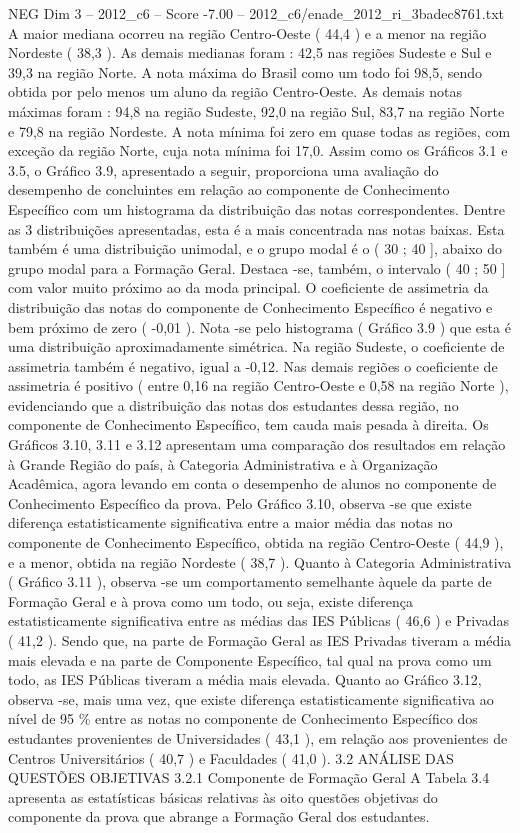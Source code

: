 \begin{textsample}{NEG Dim 3 – 2012\_c6 – Score -7.00 – 2012\_c6/enade\_2012\_ri\_3badec8761.txt}
A maior mediana ocorreu na região Centro-Oeste ( 44,4 ) e a menor na região Nordeste ( 38,3 ).
As demais medianas foram : 42,5 nas regiões Sudeste e Sul e 39,3 na região Norte.
A nota máxima do Brasil como um todo foi 98,5, sendo obtida por pelo menos um aluno da região Centro-Oeste.
As demais notas máximas foram : 94,8 na região Sudeste, 92,0 na região Sul, 83,7 na região Norte e 79,8 na região Nordeste.
A nota mínima foi zero em quase todas as regiões, com exceção da região Norte, cuja nota mínima foi 17,0.
Assim como os Gráficos 3.1 e 3.5, o Gráfico 3.9, apresentado a seguir, proporciona uma avaliação do desempenho de concluintes em relação ao componente de Conhecimento Específico com um histograma da distribuição das notas correspondentes.
Dentre as 3 distribuições apresentadas, esta é a mais concentrada nas notas baixas.
Esta também é uma distribuição unimodal, e o grupo modal é o ( 30 ; 40 ], abaixo do grupo modal para a Formação Geral.
Destaca -se, também, o intervalo ( 40 ; 50 ] com valor muito próximo ao da moda principal.
O coeficiente de assimetria da distribuição das notas do componente de Conhecimento Específico é negativo e bem próximo de zero ( -0,01 ).
Nota -se pelo histograma ( Gráfico 3.9 ) que esta é uma distribuição aproximadamente simétrica.
Na região Sudeste, o coeficiente de assimetria também é negativo, igual a -0,12.
Nas demais regiões o coeficiente de assimetria é positivo ( entre 0,16 na região Centro-Oeste e 0,58 na região Norte ), evidenciando que a distribuição das notas dos estudantes dessa região, no componente de Conhecimento Específico, tem cauda mais pesada à direita.
Os Gráficos 3.10, 3.11 e 3.12 apresentam uma comparação dos resultados em relação à Grande Região do país, à Categoria Administrativa e à Organização Acadêmica, agora levando em conta o desempenho de alunos no componente de Conhecimento Específico da prova.
Pelo Gráfico 3.10, observa -se que existe diferença estatisticamente significativa entre a maior média das notas no componente de Conhecimento Específico, obtida na região Centro-Oeste ( 44,9 ), e a menor, obtida na região Nordeste ( 38,7 ).
Quanto à Categoria Administrativa ( Gráfico 3.11 ), observa -se um comportamento semelhante àquele da parte de Formação Geral e à prova como um todo, ou seja, existe diferença estatisticamente significativa entre as médias das IES Públicas ( 46,6 ) e Privadas ( 41,2 ).
Sendo que, na parte de Formação Geral as IES Privadas tiveram a média mais elevada e na parte de Componente Específico, tal qual na prova como um todo, as IES Públicas tiveram a média mais elevada.
Quanto ao Gráfico 3.12, observa -se, mais uma vez, que existe diferença estatisticamente significativa ao nível de 95 \% entre as notas no componente de Conhecimento Específico dos estudantes provenientes de Universidades ( 43,1 ), em relação aos provenientes de Centros Universitários ( 40,7 ) e Faculdades ( 41,0 ). 3.2 ANÁLISE DAS QUESTÕES OBJETIVAS 3.2.1 Componente de Formação Geral A Tabela 3.4 apresenta as estatísticas básicas relativas às oito questões objetivas do componente da prova que abrange a Formação Geral dos estudantes.

\end{textsample}
